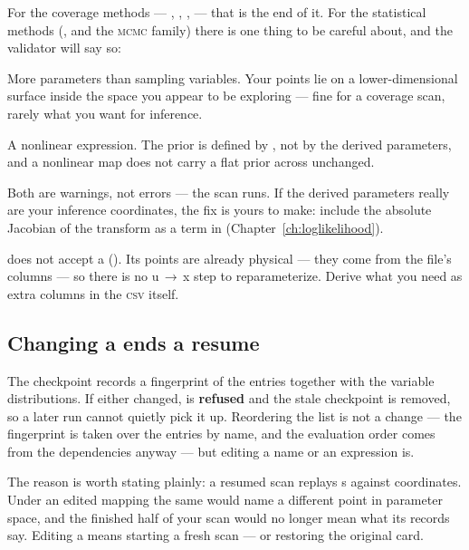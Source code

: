 For the coverage methods --- , , ,
 --- that is the end of it. For the statistical methods
(,  and the \textsc{mcmc} family) there is one thing
to be careful about, and the validator will say so:

\begin{keylist}
  \item[JV2-MAP-050] More  parameters than sampling variables. Your
        points lie on a lower-dimensional surface inside the space you appear to be
        exploring --- fine for a coverage scan, rarely what you want for inference.
  \item[JV2-MAP-051] A nonlinear  expression. The prior is defined by
        , not by the derived parameters, and a nonlinear map does not
        carry a flat prior across unchanged.
\end{keylist}

Both are warnings, not errors --- the scan runs. If the derived parameters really are
your inference coordinates, the fix is yours to make: include the absolute Jacobian of
the transform as a term in  (Chapter~\ref{ch:loglikelihood}).

\begin{jnote}
 does not accept a  (). Its points are
already physical --- they come from the file's columns --- so there is no
u\,$\rightarrow$\,x step to reparameterize. Derive what you need as extra columns in the
\textsc{csv} itself.
\end{jnote}

\subsection{Changing a  ends a resume}

The checkpoint records a fingerprint of the  entries together with the
variable distributions. If either changed,  is \textbf{refused} and the
stale checkpoint is removed, so a later run cannot quietly pick it up. Reordering the
list is not a change --- the fingerprint is taken over the entries by name, and the
evaluation order comes from the dependencies anyway --- but editing a name or an
expression is.

The reason is worth stating plainly: a resumed scan replays s against
coordinates. Under an edited mapping the same  would name a different point in
parameter space, and the finished half of your scan would no longer mean what its records
say. Editing a  means starting a fresh scan --- or restoring the original
card.

